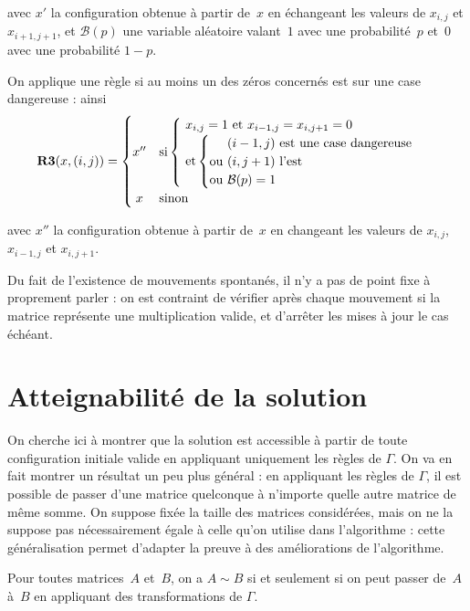 avec $x'$ la configuration obtenue à partir de~$x$ en échangeant les valeurs de $x_{i,j}$ et $x_{i+1,j+1}$, et $\mathcal{B}(p)$ une variable aléatoire valant~$1$ avec une probabilité~$p$ et~$0$ avec une probabilité $1-p$.

On applique une règle si au moins un des zéros concernés est sur une case dangereuse : ainsi \[
\textbf{R3}(x,(i,j))=
\begin{cases}
  \hfill x'' \hfill & \text {si} \begin{cases}\text{ $x_{i,j}=1$ et $x_{i-1,j}=x_{i,j+1}=0$} \\
    \text{ et} \left\{
        \begin{tabular}{@{}c@{}l}
          &\text{ $(i-1,j)$ est une case dangereuse}\\
          \text {ou}& \text{ $(i,j+1)$ l'est}\\
          \text {ou}& \text{ $\mathcal{B}(p)=1$}\\
        \end{tabular}
      \right.
    \end{cases}
  \\
  \hfill x \hfill & \text {sinon}
\end{cases}
\]

avec $x''$ la configuration obtenue à partir de~$x$ en changeant les valeurs de $x_{i,j}$, $x_{i-1,j}$ et $x_{i,j+1}$.


Du fait de l'existence de mouvements spontanés, il n'y a pas de point fixe à proprement parler : on est contraint de vérifier après chaque mouvement si la matrice représente une multiplication valide, et d'arrêter les mises à jour le cas échéant. 

\section{Atteignabilité de la solution}

On cherche ici à montrer que la solution est accessible à partir de toute configuration initiale valide en appliquant uniquement les règles de $\Gamma$. On va en fait montrer un résultat un peu plus général : en appliquant les règles de $\Gamma$, il est possible de passer d'une matrice quelconque à n'importe quelle autre matrice de même somme. On suppose fixée la taille des matrices considérées, mais on ne la suppose pas nécessairement égale à celle qu'on utilise dans l'algorithme : cette généralisation permet d'adapter la preuve à des améliorations de l'algorithme.

\begin{df*}
Pour toutes matrices~$A$ et~$B$, on a $A\sim B$ si et seulement si on peut passer de~$A$ à~$B$ en appliquant des transformations de $\Gamma$.
\end{df*}

